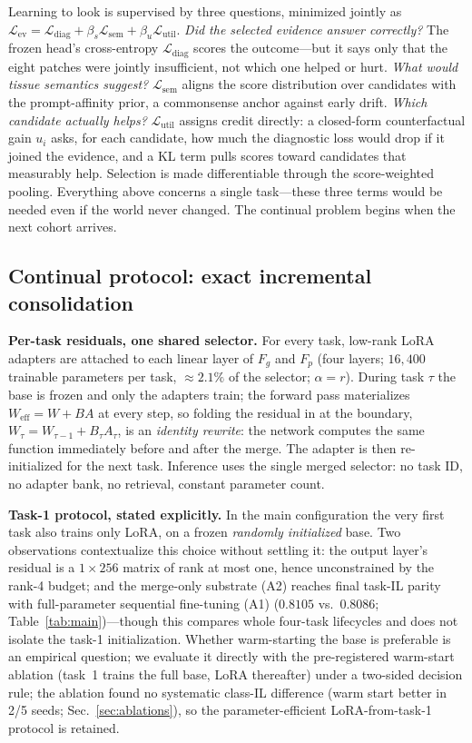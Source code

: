 \documentclass{article}
\newcommand{\Fg}{F_{g}} \newcommand{\Fp}{F_{p}}
\begin{document}
Learning to look is supervised by three questions, minimized jointly as $\mathcal{L}_{\mathrm{ev}} = \mathcal{L}_{\mathrm{diag}} + \beta_s\mathcal{L}_{\mathrm{sem}} + \beta_u\mathcal{L}_{\mathrm{util}}$. \emph{Did the selected evidence answer correctly?} The frozen head's cross-entropy $\mathcal{L}_{\mathrm{diag}}$ scores the outcome---but it says only that the eight patches were jointly insufficient, not which one helped or hurt. \emph{What would tissue semantics suggest?} $\mathcal{L}_{\mathrm{sem}}$ aligns the score distribution over candidates with the prompt-affinity prior, a commonsense anchor against early drift. \emph{Which candidate actually helps?} $\mathcal{L}_{\mathrm{util}}$ assigns credit directly: a closed-form counterfactual gain $u_i$ asks, for each candidate, how much the diagnostic loss would drop if it joined the evidence, and a KL term pulls scores toward candidates that measurably help. Selection is made differentiable through the score-weighted pooling. Everything above concerns a single task---these three terms would be needed even if the world never changed. The continual problem begins when the next cohort arrives.

\subsection{Continual protocol: exact incremental consolidation}
\label{ssec:cl}
\textbf{Per-task residuals, one shared selector.} For every task, low-rank LoRA adapters \cite{hu2022lora} are attached to each linear layer of $\Fg$ and $\Fp$ (four layers; $16{,}400$ trainable parameters per task, ${\approx}2.1\%$ of the selector; $\alpha{=}r$). During task $\tau$ the base is frozen and only the adapters train; the forward pass materializes $W_{\mathrm{eff}} = W + BA$ at every step, so folding the residual in at the boundary, $W_\tau = W_{\tau-1} + B_\tau A_\tau$, is an \emph{identity rewrite}: the network computes the same function immediately before and after the merge. The adapter is then re-initialized for the next task. Inference uses the single merged selector: no task ID, no adapter bank, no retrieval, constant parameter count.

\textbf{Task-1 protocol, stated explicitly.} In the main configuration the very first task also trains only LoRA, on a frozen \emph{randomly initialized} base. Two observations contextualize this choice without settling it: the output layer's residual is a $1{\times}256$ matrix of rank at most one, hence unconstrained by the rank-4 budget; and the merge-only substrate (A2) reaches final task-IL parity with full-parameter sequential fine-tuning (A1) ($0.8105$ vs.\ $0.8086$; Table~\ref{tab:main})---though this compares whole four-task lifecycles and does not isolate the task-1 initialization. Whether warm-starting the base is preferable is an empirical question; we evaluate it directly with the pre-registered warm-start ablation (task~1 trains the full base, LoRA thereafter) under a two-sided decision rule; the ablation found no systematic class-IL difference (warm start better in 2/5 seeds; Sec.~\ref{sec:ablations}), so the parameter-efficient LoRA-from-task-1 protocol is retained.
\end{document}
